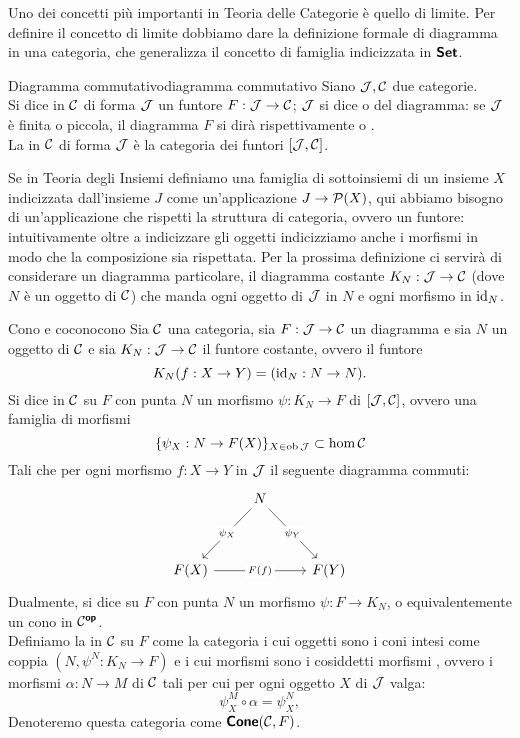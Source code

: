 \documentclass{article}
\renewcommand\C{\mc{C}}
\newcommand\J{\mc{J}}
\begin{document}
Uno dei concetti più importanti in Teoria delle Categorie è quello di limite. Per definire il concetto di limite dobbiamo dare la definizione formale di diagramma in una categoria, che generalizza il concetto di famiglia indicizzata in $\text{\sffamily\textbf{Set}}$.

\begin{definition}{Diagramma commutativo}{diagramma commutativo}
    Siano $\J, \C$ due categorie.\\
    Si dice  in $\C$ di forma $\J$ un funtore $F:\J\to\C$; $\J$ si dice  o  del diagramma: se $\J$ è finita o piccola, il diagramma $F$ si dirà rispettivamente  o .\\
    La  in $\C$ di forma $\J$ è la categoria dei funtori $[\J,\C]$.
\end{definition}

Se in Teoria degli Insiemi definiamo una famiglia di sottoinsiemi di un insieme $X$ indicizzata dall'insieme $J$ come un'applicazione $J\to \mathcal{P}(X)$, qui abbiamo bisogno di un'applicazione che rispetti la struttura di categoria, ovvero un funtore: intuitivamente oltre a indicizzare gli oggetti indicizziamo anche i morfismi in modo che la composizione sia rispettata. Per la prossima definizione ci servirà di considerare un diagramma particolare, il diagramma costante $K_N : \J\to \C$ (dove $N$ è un oggetto di $\C$) che manda ogni oggetto di $\J$ in $N$ e ogni morfismo in $\operatorname{id}_N$.

\begin{definition}{Cono e cocono}{cono}
    Sia $\C$ una categoria, sia $F: \J\to\C$ un diagramma e sia $N$ un oggetto di $\C$ e sia $K_N:\J\to\C$ il funtore costante, ovvero il funtore 
    \[K_N(f:X\to Y) = (\operatorname{id}_N:N\to N).\]
    Si dice  in $\C$ su $F$ con punta $N$ un morfismo $\psi : K_N \to F$ di $[\J,\C]$, ovvero una famiglia di morfismi \[\{\psi_X : N\to F(X)\}_{X \in \ob\J} \subset \hom\C\]
    Tali che per ogni morfismo $f:X\to Y$ in $\J$ il seguente diagramma commuti:
    \[\begin{tikzcd}
    	& N \\
    	\\
    	{F(X)} && {F(Y)}
    	\arrow["{\psi_X}"{description}, from=1-2, to=3-1]
    	\arrow["{\psi_Y}"{description}, from=1-2, to=3-3]
	    \arrow["{F(f)}"{description}, from=3-1, to=3-3]
    \end{tikzcd}\]
    Dualmente, si dice  su $F$ con punta $N$ un morfismo $\psi : F \to K_N$, o equivalentemente un cono in $\C^\op$.\\
    Definiamo la  in $\C$ su $F$ come la categoria i cui oggetti sono i coni intesi come coppia $(N, \psi^N: K_N \to F )$ e i cui morfismi sono i cosiddetti morfismi , ovvero i morfismi $\alpha : N\to M$ di $\C$ tali per cui per ogni oggetto $X$ di $\J$ valga:
    \[\psi^M_X\circ \alpha = \psi^N_X,\]
    Denoteremo questa categoria come $\cone(\C,F)$.
\end{definition}
\end{document}

